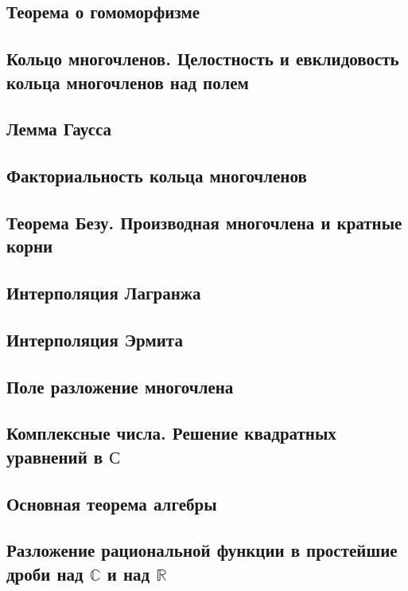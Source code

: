 \documentclass[a4paper,100pt]{article}
\theoremstyle{indented}
\theoremstyle{definition}
\theoremstyle{remark}
\begin{document}
\subsection{Теорема о гомоморфизме}

\subsection{Кольцо многочленов. Целостность и евклидовость кольца многочленов над полем}

\subsection{Лемма Гаусса}

\subsection{Факториальность кольца многочленов}

\subsection{Теорема Безу. Производная многочлена и кратные корни}

\subsection{Интерполяция Лагранжа}

\subsection{Интерполяция Эрмита}

\subsection{Поле разложение многочлена}

\subsection{Комплексные числа. Решение квадратных уравнений в $\mathbb{С}$}

\subsection{Основная теорема алгебры}

\subsection{Разложение рациональной функции в простейшие дроби над $\mathbb{C}$ и над $\mathbb{R}$}
\end{document}
